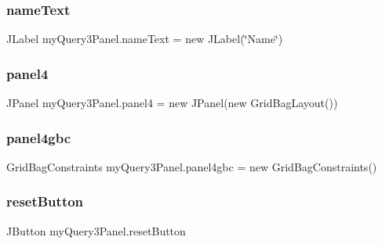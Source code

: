 \subsubsection{\texorpdfstring{name\+Text}{nameText}}
{\footnotesize\ttfamily J\+Label my\+Query3\+Panel.\+name\+Text = new J\+Label(\char`\"{}Name\char`\"{})\hspace{0.3cm}{\ttfamily [private]}}

\hypertarget{classmy_query3_panel_a2ac952531b06b879f00a70bac72d21fc}{}\label{classmy_query3_panel_a2ac952531b06b879f00a70bac72d21fc} 
\subsubsection{\texorpdfstring{panel4}{panel4}}
{\footnotesize\ttfamily J\+Panel my\+Query3\+Panel.\+panel4 = new J\+Panel(new Grid\+Bag\+Layout())\hspace{0.3cm}{\ttfamily [private]}}

\hypertarget{classmy_query3_panel_ad2ccf349d9e4a1c851e4a33f03d5be23}{}\label{classmy_query3_panel_ad2ccf349d9e4a1c851e4a33f03d5be23} 
\subsubsection{\texorpdfstring{panel4gbc}{panel4gbc}}
{\footnotesize\ttfamily Grid\+Bag\+Constraints my\+Query3\+Panel.\+panel4gbc = new Grid\+Bag\+Constraints()\hspace{0.3cm}{\ttfamily [private]}}

\hypertarget{classmy_query3_panel_ac392a21f5bf8b94abc2277cd7f195714}{}\label{classmy_query3_panel_ac392a21f5bf8b94abc2277cd7f195714} 
\subsubsection{\texorpdfstring{reset\+Button}{resetButton}}
{\footnotesize\ttfamily J\+Button my\+Query3\+Panel.\+reset\+Button\hspace{0.3cm}{\ttfamily [private]}}

\hypertarget{classmy_query3_panel_aa69c674ee3284608d2df2c813c8a0ae0}{}\label{classmy_query3_panel_aa69c674ee3284608d2df2c813c8a0ae0} 
